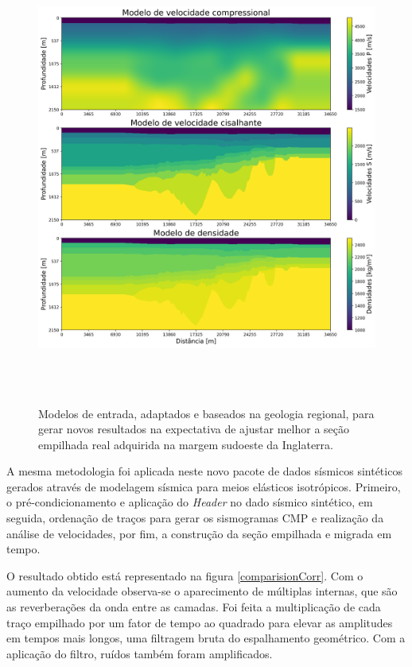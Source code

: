 \documentclass[
	12pt,				%
	openright,			%
	oneside,			%
	a4paper,			%
	english,			%
	brazil				%
	]{abntex2}
\begin{document}
	\begin{figure}[htp!]
		\centering
		\includegraphics[width=16cm,height=15cm]{../imagens/ModelosInput_Corr.png}
		\caption{Modelos de entrada, adaptados e baseados na geologia regional, para gerar novos resultados na expectativa de ajustar melhor a seção empilhada real adquirida na margem sudoeste da Inglaterra.}
		\label{modeloInputCorr}
	\end{figure}
%	
	A mesma metodologia foi aplicada neste novo pacote de dados sísmicos sintéticos gerados através de modelagem sísmica para meios elásticos isotrópicos. Primeiro, o pré-condicionamento e aplicação do \textit{Header} no dado sísmico sintético, em seguida, ordenação de traços para gerar os sismogramas CMP e realização da análise de velocidades, por fim, a construção da seção empilhada e migrada em tempo. 
	
	O resultado obtido está representado na figura \ref{comparisionCorr}. Com o aumento da velocidade observa-se o aparecimento de múltiplas internas, que são as reverberações da onda entre as camadas. Foi feita a multiplicação de cada traço empilhado por um fator de tempo ao quadrado para elevar as amplitudes em tempos mais longos, uma filtragem bruta do espalhamento geométrico. Com a aplicação do filtro, ruídos também foram amplificados. 
		
\end{document}

